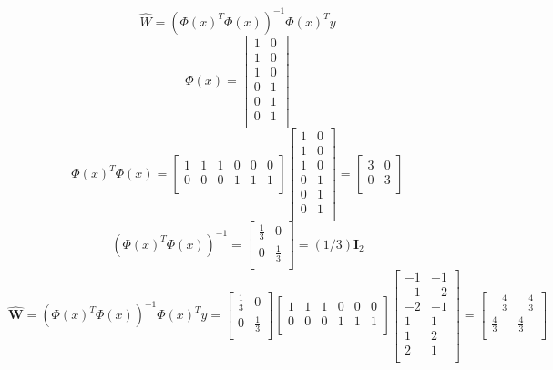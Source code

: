 \documentclass[draft]{exam} %
\theoremstyle{definition} \newtheorem*{defn}{Definition}
\begin{document}
\begin{questions}
\begin{solution}  %
$$\hat{W} = (\Phi(x)^T \Phi(x))^{-1}\Phi(x)^T y$$
\[
\Phi(x) =
\begin{bmatrix}
1 & 0 \\
1 & 0 \\
1 & 0 \\
0 & 1 \\
0 & 1 \\
0 & 1 \\
\end{bmatrix}
\]
\[
\Phi(x)^T \Phi(x) =
\begin{bmatrix}
1 & 1 & 1 & 0 & 0 & 0 \\
0 & 0 & 0 & 1 & 1 & 1 \\
\end{bmatrix}
\begin{bmatrix}
1 & 0 \\
1 & 0 \\
1 & 0 \\
0 & 1 \\
0 & 1 \\
0 & 1 \\
\end{bmatrix}
=
\begin{bmatrix}
3 & 0 \\
0 & 3 \\
\end{bmatrix}
\]
\[
(\Phi(x)^T \Phi(x))^{-1} =
\begin{bmatrix}
\frac{1}{3} & 0 \\
0 & \frac{1}{3} \\
\end{bmatrix}
= (1/3)\pmb{I}_2
\]
\[
\pmb{\hat{W}} = (\Phi(x)^T \Phi(x))^{-1} \Phi(x)^T y =
\begin{bmatrix}
\frac{1}{3} & 0 \\
0 & \frac{1}{3} \\
\end{bmatrix}
\begin{bmatrix}
1 & 1 & 1 & 0 & 0 & 0 \\
0 & 0 & 0 & 1 & 1 & 1 \\
\end{bmatrix}
\begin{bmatrix}
-1 & -1 \\
-1 & -2 \\
-2 & -1 \\
1 & 1 \\
1 & 2 \\
2 & 1 \\
\end{bmatrix}
=
\begin{bmatrix}
-\frac{4}{3} & -\frac{4}{3} \\
\frac{4}{3} & \frac{4}{3} \\
\end{bmatrix}
\]
\end{solution}


\end{questions}
\end{document}
